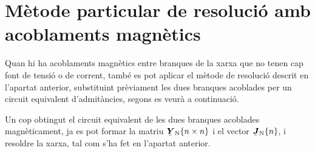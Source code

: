 \section{M\`{e}tode particular de resoluci\'{o} amb acoblaments magn\`{e}tics}

Quan hi ha acoblaments magn\`{e}tics entre branques de la xarxa que no
tenen cap font de tensi\'{o} o de corrent, tamb\'{e} es pot aplicar el
m\`{e}tode de resoluci\'{o} descrit en l'apartat anterior, substituint
pr\`{e}viament les dues branques acoblades per un circuit equivalent
d'admit\`{a}ncies, segons es veur\`{a} a continuaci\'{o}.

Un cop obtingut el circuit equivalent de les dues branques acoblades
magn\`{e}ticament, ja es pot formar la matriu $\mcmplx{Y}\ped{N}\{n \times n\}$ i
el vector $\mcmplx{J}\ped{N}\{n\}$, i  resoldre la xarxa, tal com s'ha fet en
l'apartat anterior.


